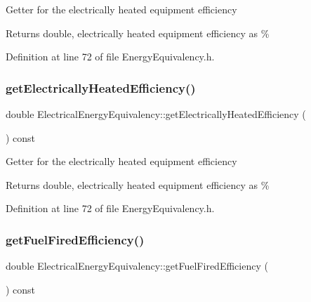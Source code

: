 Getter for the electrically heated equipment efficiency

\begin{DoxyReturn}{Returns}
double, electrically heated equipment efficiency as \% 
\end{DoxyReturn}


Definition at line 72 of file Energy\+Equivalency.\+h.

\mbox{\label{class_electrical_energy_equivalency_a83438510f522aa045f4b1007fca1d2fd}} 
\subsubsection{\texorpdfstring{get\+Electrically\+Heated\+Efficiency()}{getElectricallyHeatedEfficiency()}\hspace{0.1cm}{\footnotesize\ttfamily [3/3]}}
{\footnotesize\ttfamily double Electrical\+Energy\+Equivalency\+::get\+Electrically\+Heated\+Efficiency (\begin{DoxyParamCaption}{ }\end{DoxyParamCaption}) const\hspace{0.3cm}{\ttfamily [inline]}}

Getter for the electrically heated equipment efficiency

\begin{DoxyReturn}{Returns}
double, electrically heated equipment efficiency as \% 
\end{DoxyReturn}


Definition at line 72 of file Energy\+Equivalency.\+h.

\mbox{\label{class_electrical_energy_equivalency_adc8def25354f6ba8c3479040507b0ea6}} 
\subsubsection{\texorpdfstring{get\+Fuel\+Fired\+Efficiency()}{getFuelFiredEfficiency()}\hspace{0.1cm}{\footnotesize\ttfamily [1/3]}}
{\footnotesize\ttfamily double Electrical\+Energy\+Equivalency\+::get\+Fuel\+Fired\+Efficiency (\begin{DoxyParamCaption}{ }\end{DoxyParamCaption}) const\hspace{0.3cm}{\ttfamily [inline]}}

